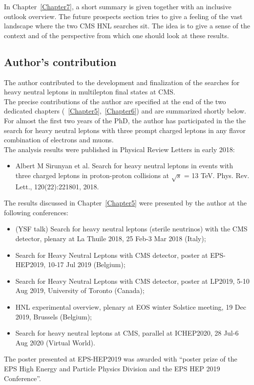 In Chapter~\ref{Chapter7}, a short summary is given together with an
inclusive outlook overview. The future prospects section tries to give a feeling of the vast landscape
where the two CMS HNL searches sit. The idea is to give a sense of the
context and of the perspective from which one should look at these results.

\subsection*{Author's contribution}

The author contributed to the development and finalization of the
searches for heavy neutral leptons in multilepton final
states at CMS.\\
The precise contributions of the author are specified at
the end of the two dedicated chapters
(~\ref{Chapter5},~\ref{Chapter6}) 
and are summarized shortly below.\\

For almost the first two years of the PhD, the author
has participated in the the search for heavy neutral leptons with three
prompt charged leptons in any flavor combination of electrons and
muons. \\
The analysis
results were published in Physical Review Letters in early 2018:
\begin{itemize}
\setlength\itemsep{-0.1em}
\item Albert M Sirunyan et al. Search for heavy neutral leptons in events with three charged leptons
in proton-proton collisions at $\sqrt{s}$ = 13 TeV. Phys. Rev. Lett., 120(22):221801, 2018.
\end{itemize}

The results discussed in Chapter~\ref{Chapter5} were presented by the author at the following
conferences:
\begin{itemize}
\setlength\itemsep{-0.1em}
\item (YSF talk) Search for heavy neutral leptons (sterile
  neutrinos) with the CMS detector, plenary at La Thuile 2018, 25
  Feb-3 Mar 2018 (Italy);
\item Search for Heavy Neutral Leptons with CMS detector, poster at
  EPS-HEP2019, 10-17 Jul 2019 (Belgium);
\item Search for Heavy Neutral Leptons with CMS detector, poster at
  LP2019, 5-10 Aug 2019, University of Toronto (Canada);
\item HNL experimental overview, plenary at EOS winter Solstice
  meeting, 19 Dec 2019, Brussels (Belgium);
\item  Search for heavy neutral leptons at CMS, parallel at
  ICHEP2020, 28 Jul-6 Aug 2020 (Virtual World).
\end{itemize}
The poster presented at EPS-HEP2019 was awarded with ``poster prize of
the EPS High Energy and Particle Physics Division and the EPS HEP 2019
Conference''.\\
 
